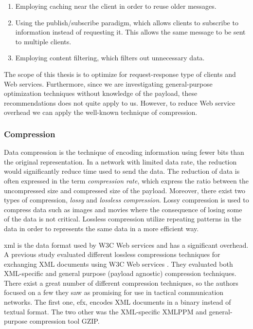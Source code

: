 \begin{enumerate}
    \item Employing caching near the client in order to reuse older messages.
    \item Using the publish/subscribe paradigm, which allows clients to subscribe to
    information instead of requesting it. This allows the same message to be sent
    to multiple clients.
    \item Employing content filtering, which filters out unnecessary data.
\end{enumerate}

The scope of this thesis is to optimize for request-response type of clients
and Web services. Furthermore, since we are investigating general-purpose
optimization techniques without knowledge of the payload, these
recommendations does not quite apply to us. However, to reduce Web service
overhead we can apply the well-known technique of compression.

\subsubsection{Compression}

Data compression is the technique of encoding information using fewer bits than
the original representation. In a network with limited data rate, the reduction
would significantly reduce time used to send the data. The reduction of data is
often expressed in the term \textit{compression rate}, which express the ratio
between the uncompressed size and compressed size of the payload.  Moreover,
there exist two types of compression, \textit{lossy} and \textit{lossless
compression}. Lossy compression is used to compress data such as images and
movies where the consequence of losing some of the data is not critical.
Lossless compression utilize repeating patterns in the data in order to
represents the same data in a more efficient way.

\gls{xml} is the data format used by W3C Web services and has a significant
overhead. A previous study evaluated different lossless compressions techniques
for exchanging XML documents using W3C Web services \cite{johnsen-compression}.
They evaluated both XML-specific and general purpose (payload agnostic)
compression techniques. There exist a great number of different compression
techniques, so the authors focused on a few they saw as promising for use in
tactical communication networks. The first one, \gls{efx}, encodes XML documents
in a binary instead of textual format. The two other was the XML-specific XMLPPM
and general-purpose compression tool GZIP.

